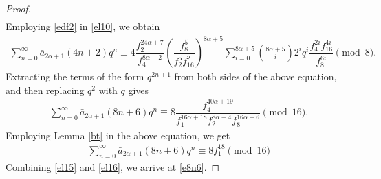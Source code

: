 \documentclass[11pt,a4paper]{article}
\numberwithin{equation}{section}
\theoremstyle{plain}
\begin{document}
\begin{proof}
\begin{align}
		\end{align}
		Employing \eqref{edf2} in \eqref{el10}, we obtain
		\begin{align*}
	    \sum_{n=0}^{\infty}\bar{a}_{2\alpha+1}(4n+2)q^n\equiv 4\dfrac{f_2^{24\alpha+7}}{f_4^{8\alpha-2}}\left(\dfrac{f_8^5}{f_2^5f_{16}^2}\right)^{8\alpha+5}\sum_{i=0}^{8\alpha+5}\binom{8\alpha+5}{i}2^iq^i\dfrac{f_4^{2i}f_{16}^{4i}}{f_8^{6i}}\pmod 8.
		\end{align*}
		Extracting the terms of the form $q^{2n+1}$ from both sides of the above equation, and then replacing $q^{2}$ with $q$ gives
		\begin{align*}
		\sum_{n=0}^{\infty}\bar{a}_{2\alpha+1}(8n+6)q^n\equiv8\dfrac{f_4^{40\alpha+19}}{f_1^{16\alpha+18}f_2^{8\alpha-4}f_8^{16\alpha+6}}\pmod {16}.
		\end{align*}
		Employing Lemma \ref{bt} in the above equation, we get
	\begin{align}\label{el16}
    \sum_{n=0}^{\infty}\bar{a}_{2\alpha+1}(8n+6)q^n\equiv 8f_1^{18}\pmod{16}
	\end{align}
	Combining \eqref{el15} and \eqref{el16}, we arrive at \eqref{e8n6}.
\end{proof}
\end{document}
